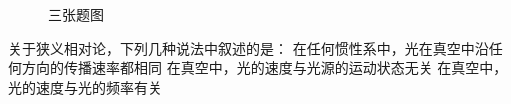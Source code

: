 \begin{figure}[!h]
	\quad
	\caption{三张题图}
\end{figure}
关于狭义相对论，下列几种说法中叙述的是：
{在任何惯性系中，光在真空中沿任何方向的传播速率都相同}
{在真空中，光的速度与光源的运动状态无关}
{在真空中，光的速度与光的频率有关}

